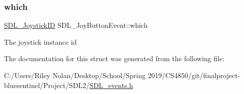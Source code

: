 \subsubsection{\texorpdfstring{which}{which}}
{\footnotesize\ttfamily \mbox{\hyperlink{_s_d_l__joystick_8h_a3c3d32500cb08f76ee8077983912c0bd}{S\+D\+L\+\_\+\+Joystick\+ID}} S\+D\+L\+\_\+\+Joy\+Button\+Event\+::which}

The joystick instance id 

The documentation for this struct was generated from the following file\+:\begin{DoxyCompactItemize}
\item 
C\+:/\+Users/\+Riley Nolan/\+Desktop/\+School/\+Spring 2019/\+C\+S4850/git/finalproject-\/bluesentinel/\+Project/\+S\+D\+L2/\mbox{\hyperlink{_s_d_l__events_8h}{S\+D\+L\+\_\+events.\+h}}\end{DoxyCompactItemize}
